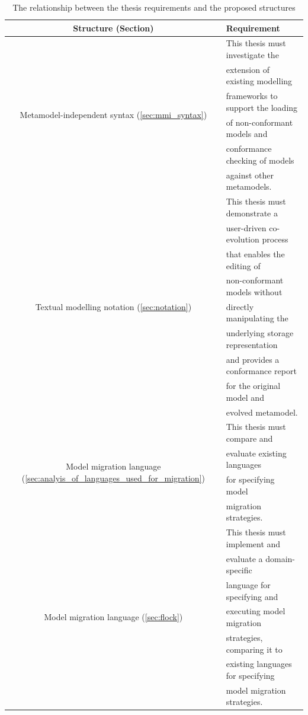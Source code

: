 \begin{table}[tbhp]
	\centering
	\begin{tabular}{|c|l|}
		\hline
		\textbf{Structure (Section)} & \textbf{Requirement} \\
		\hline
		\multirow{6}{*}{Metamodel-independent syntax (\ref{sec:mmi_syntax})} & This thesis must investigate the \\
		& extension of existing modelling \\ 
		& frameworks to support the loading \\
		& of non-conformant models and \\
		& conformance checking of models \\
		& against other metamodels. \\
		\hline
		\multirow{9}{*}{Textual modelling notation (\ref{sec:notation})} & This thesis must demonstrate a \\
		& user-driven co-evolution process \\
		& that enables the editing of \\
		& non-conformant models without \\
		& directly manipulating the \\
		& underlying storage representation \\
		& and provides a conformance report \\
		& for the original model and \\
		& evolved metamodel. \\
		\hline
		\multirow{4}{*}{Model migration language (\ref{sec:analyis_of_languages_used_for_migration})} & This thesis must compare and \\
    & evaluate existing languages \\
		& for specifying model   \\
		& migration strategies.  \\
		\hline
		\multirow{7}{*}{Model migration language (\ref{sec:flock})} & This thesis must implement and \\
		& evaluate a domain-specific \\
		& language for specifying and \\
		& executing model migration \\
		& strategies, comparing it to \\
		& existing languages for specifying \\ 
		& model migration strategies. \\
		\hline
	\end{tabular}
	\caption[Relating the thesis requirements and proposed structures]{The relationship between the thesis requirements and the proposed structures}
	\label{tab:implementation_to_requirements}
\end{table}

